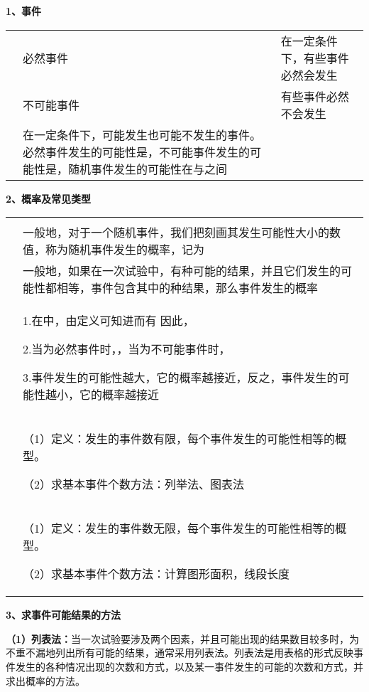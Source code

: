 \textbf{1、事件}

\begin{longtable}[]{@{}lll@{}}
\toprule
\endhead
& 必然事件 & 在一定条件下，有些事件必然会发生\tabularnewline
& 不可能事件 & 有些事件必然不会发生\tabularnewline
&
在一定条件下，可能发生也可能不发生的事件。必然事件发生的可能性是，不可能事件发生的可能性是，随机事件发生的可能性在与之间
&\tabularnewline
\bottomrule
\end{longtable}

\textbf{2、概率及常见类型}

\begin{longtable}[]{@{}ll@{}}
\toprule
\endhead
&\tabularnewline
&
一般地，对于一个随机事件，我们把刻画其发生可能性大小的数值，称为随机事件发生的概率，记为\tabularnewline
&
一般地，如果在一次试验中，有种可能的结果，并且它们发生的可能性都相等，事件包含其中的种结果，那么事件发生的概率\tabularnewline
\begin{minipage}[t]{0.47\columnwidth}\raggedright
\strut
\end{minipage} & \begin{minipage}[t]{0.47\columnwidth}\raggedright
1.在中，由定义可知进而有 因此，

2.当为必然事件时，，当为不可能事件时，

3.事件发生的可能性越大，它的概率越接近，反之，事件发生的可能性越小，它的概率越接近\strut
\end{minipage}\tabularnewline
\begin{minipage}[t]{0.47\columnwidth}\raggedright
\strut
\end{minipage} & \begin{minipage}[t]{0.47\columnwidth}\raggedright
（1）定义：发生的事件数有限，每个事件发生的可能性相等的概型。

（2）求基本事件个数方法：列举法、图表法\strut
\end{minipage}\tabularnewline
\begin{minipage}[t]{0.47\columnwidth}\raggedright
\strut
\end{minipage} & \begin{minipage}[t]{0.47\columnwidth}\raggedright
（1）定义：发生的事件数无限，每个事件发生的可能性相等的概型。

（2）求基本事件个数方法：计算图形面积，线段长度\strut
\end{minipage}\tabularnewline
\bottomrule
\end{longtable}

\textbf{3、求事件可能结果的方法}

\textbf{（1）列表法：}当一次试验要涉及两个因素，并且可能出现的结果数目较多时，为不重不漏地列出所有可能的结果，通常采用列表法。列表法是用表格的形式反映事件发生的各种情况出现的次数和方式，以及某一事件发生的可能的次数和方式，并求出概率的方法。

